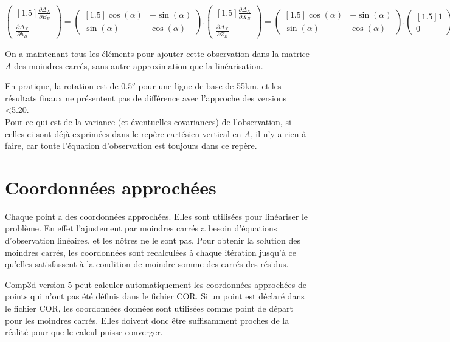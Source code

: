 \documentclass[french]{report}
\begin{document}
$$
\begin{pmatrix}[1.5] \frac{\partial \Delta_X}{\partial E_B}\\ \frac{\partial \Delta_X}{\partial h_B}\end{pmatrix}
=
\begin{pmatrix}[1.5] \cos(\alpha) & -\sin(\alpha) \\ \sin(\alpha) & \cos(\alpha) \end{pmatrix}
.
\begin{pmatrix}[1.5] \frac{\partial \Delta_X}{\partial X_B}\\ \frac{\partial \Delta_X}{\partial Z_B} \end{pmatrix}
=
\begin{pmatrix}[1.5] \cos(\alpha) & -\sin(\alpha) \\ \sin(\alpha) & \cos(\alpha) \end{pmatrix}
.
\begin{pmatrix}[1.5] 1\\ 0 \end{pmatrix}
$$

On a maintenant tous les éléments pour ajouter cette observation dans la matrice $A$ des moindres carrés, sans autre approximation que la linéarisation.

En pratique, la rotation est de $0.5^o$ pour une ligne de base de 55km, et les résultats finaux ne présentent pas de différence avec l'approche des versions <5.20.
\ \\

Pour ce qui est de la variance (et éventuelles covariances) de l'observation, si celles-ci sont déjà exprimées dans le repère cartésien vertical en $A$, il n'y a rien à faire, car toute l'équation d'observation est toujours dans ce repère.

\section{Coordonnées approchées}

Chaque point a des coordonnées approchées. Elles sont utilisées pour linéariser le problème.
En effet l'ajustement par moindres carrés a besoin d'équations d'observation linéaires, et les
nôtres ne le sont pas. Pour obtenir la solution des moindres carrés, les coordonnées sont
recalculées à chaque itération jusqu'à ce qu'elles satisfassent à la condition de moindre
somme des carrés des résidus.

Comp3d version 5 peut calculer automatiquement les coordonnées approchées de points qui n'ont pas été
définis dans le fichier COR.
Si un point est déclaré dans le fichier COR, les coordonnées données sont utilisées comme point de
départ pour les moindres carrés. Elles doivent donc être suffisamment proches de la réalité pour
que le calcul puisse converger.
\end{document}
